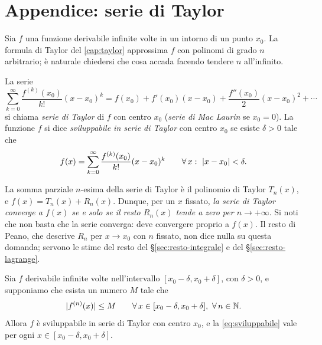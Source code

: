 \section{Appendice: serie di Taylor}
\label{sec:serie-taylor}

Sia $f$ una funzione derivabile infinite volte in un intorno di un punto $x_{0}$. La
formula di Taylor del \cref{cap:taylor} approssima $f$ con polinomi di grado $n$
arbitrario; è naturale chiedersi che cosa accada facendo tendere $n$ all'infinito.

\begin{definizione}\label{def:serie-taylor}
La serie
\begin{equation}\label{eq:serie-taylor}
  \sum_{k=0}^{\infty}\frac{f^{(k)}(x_{0})}{k!}(x-x_{0})^{k}
  =f(x_{0})+f'(x_{0})(x-x_{0})+\frac{f''(x_{0})}2(x-x_{0})^{2}+\cdots
\end{equation}
si chiama \emph{serie di Taylor} di $f$ con centro $x_{0}$ (\emph{serie di Mac Laurin} se
$x_{0}=0$). La funzione $f$ si dice \emph{sviluppabile in serie di Taylor} con centro $x_{0}$
se esiste $\delta>0$ tale che
\begin{equation}\label{eq:sviluppabile}
  f(x)=\sum_{k=0}^{\infty}\frac{f^{(k)}(x_{0})}{k!}(x-x_{0})^{k} \qquad\forall\, x:\ \lvert x-x_{0}\rvert<\delta .
\end{equation}
\end{definizione}

La somma parziale $n$-esima della serie di Taylor è il polinomio di Taylor $T_{n}(x)$, e
$f(x)=T_{n}(x)+R_{n}(x)$. Dunque, per un $x$ fissato, \emph{la serie di Taylor converge a
$f(x)$ se e solo se il resto $R_{n}(x)$ tende a zero per $n\to+\infty$}. Si noti che non basta
che la serie converga: deve convergere proprio a $f(x)$. Il resto di Peano, che descrive
$R_{n}$ per $x\to x_{0}$ con $n$ fissato, non dice nulla su questa domanda; servono le stime del
resto del \S\ref{sec:resto-integrale} e del \S\ref{sec:resto-lagrange}.

\begin{teorema}\label{teo:sviluppabilita}
Sia $f$ derivabile infinite volte nell'intervallo $[x_{0}-\delta,x_{0}+\delta]$, con $\delta>0$, e
supponiamo che esista un numero $M$ tale che
\begin{equation}\label{eq:derivate-equilimitate}
  \abs{f^{(n)}(x)}\le M \qquad\perogni x\in[x_{0}-\delta,x_{0}+\delta],\ \perogni n\in\N .
\end{equation}
Allora $f$ è sviluppabile in serie di Taylor con centro $x_{0}$, e la \eqref{eq:sviluppabile}
vale per ogni $x\in[x_{0}-\delta,x_{0}+\delta]$.
\end{teorema}

